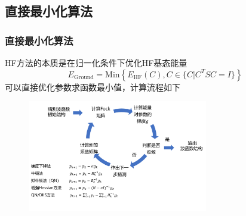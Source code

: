 \documentclass[10pt,aspectratio=43,mathserif,UTF8]{beamer}
\begin{document}
\subsection{直接最小化算法}
\begin{frame}
	\frametitle{直接最小化算法}
	HF方法的本质是在归一化条件下优化HF基态能量
	\begin{equation}
	E_{\text{Ground}}=\text{Min}\left \{ E_{\text{HF}}(C), C \in  \{C| C^TSC=I  \} \right \}
	\end{equation}
	可以直接优化参数求函数最小值，计算流程如下

	\begin{figure}[htbp]
		\centering
		\includegraphics[width=0.7\textwidth]{figure/HF/QN2.png}
	\end{figure}


	
\end{frame}
\end{document}
